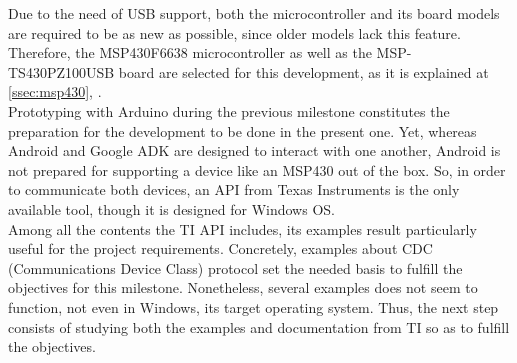 		Due to the need of USB support, both the microcontroller and its board models are required to be
		as new as possible, since older models lack this feature. Therefore, the MSP430F6638 microcontroller
		as well as the MSP-TS430PZ100USB board are selected for this development, as it is explained at
		\autoref{ssec:msp430}, .\\
		
		Prototyping with Arduino during the previous milestone constitutes the preparation for the development
		to be done in the present one. Yet, whereas Android and Google ADK are designed to interact with
		one another, Android is not prepared for supporting a device like an MSP430 out of the box. So, in order
		to communicate both devices, an API from Texas Instruments \cite{TIUSB} is the only available tool, though
		it is designed for Windows OS.\\
		
		Among all the contents the TI API includes, its examples result particularly useful for the project
		requirements. Concretely, examples about CDC (Communications Device Class) protocol set the needed
		basis to fulfill the objectives for this milestone. Nonetheless, several examples does not seem to
		function, not even in Windows, its target operating system. Thus, the next step consists of studying
		both the examples and documentation from TI so as to fulfill the objectives.\\
		
